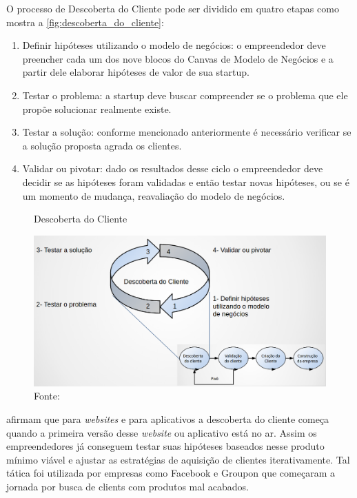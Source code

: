 O processo de Descoberta do Cliente pode ser dividido em quatro etapas como mostra a \autoref{fig:descoberta_do_cliente}:
\begin{enumerate}
\item Definir hipóteses utilizando o modelo de negócios: o empreendedor deve preencher cada um dos nove blocos do Canvas de Modelo de Negócios e a partir dele elaborar hipóteses de valor de sua startup.
\item Testar o problema: a startup deve buscar compreender se o problema que ele propõe solucionar realmente existe.
\item Testar a solução: conforme mencionado anteriormente é necessário verificar se a solução proposta agrada os clientes.
\item Validar ou pivotar: dado os resultados desse ciclo o empreendedor deve decidir se as hipóteses foram validadas e então testar novas hipóteses, ou se é um momento de mudança, reavaliação do modelo de negócios.
\end{enumerate}

\begin{figure}[H]
\caption{Descoberta do Cliente}
\centerline{\includegraphics[scale=0.3]{img/descoberta_do_cliente}}
\label{fig:descoberta_do_cliente}
\caption* {Fonte: }
\end{figure}

 afirmam que para \textit{websites} e para aplicativos a descoberta do cliente começa quando a primeira versão desse \textit{website} ou aplicativo está no ar. Assim os empreendedores já conseguem testar suas hipóteses baseados nesse produto mínimo viável e ajustar as estratégias de aquisição de clientes iterativamente. Tal tática foi utilizada por empresas como Facebook e Groupon que começaram a jornada por busca de clients com produtos mal acabados.

